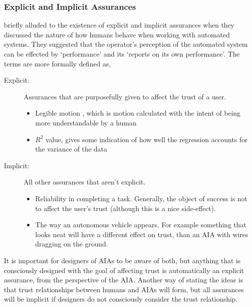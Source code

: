 \subsubsection{Explicit and Implicit Assurances}
\citet{Sheridan1984-kx} briefly alluded to the existence of explicit and implicit assurances when they discussed the nature of how humans behave when working with automated systems. They suggested that the operator's perception of the automated system can be effected by `performance' and its `reports on its own performance'. The terms are more formally defined as,

\begin{description}
    \item [Explicit:] Assurances that are purposefully given to affect the trust of a user.
    \begin{itemize}
        \item Legible motion \cite{Dragan2013-wd}, which is motion calculated with the intent of being more understandable by a human
        \item $R^2$ value, gives some indication of how well the regression accounts for the variance of the data
    \end{itemize}
    \item [Implicit:] All other assurances that aren't explicit.
    \begin{itemize}
        \item Reliability in completing a task. Generally, the object of success is not to affect the user's trust (although this is a nice side-effect).
        \item The way an autonomous vehicle appears. For example something that looks neat will have a different effect on trust, than an AIA with wires dragging on the ground. 
    \end{itemize}
\end{description}

It is important for designers of AIAs to be aware of both, but anything that is consciously designed with the goal of affecting trust is automatically an explicit assurance, from the perspective of the AIA. Another way of stating the ideas is that trust relationships between humans and AIAs will form, but all assurances will be implicit if designers do not consciously consider the trust relationship. 

